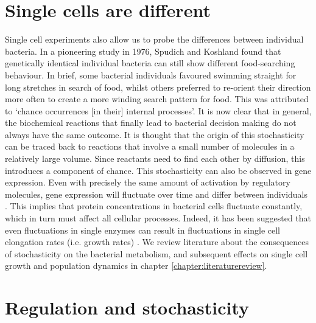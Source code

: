 \section{Single cells are different} 

Single cell experiments also allow us to probe the differences between individual bacteria.
%
In a pioneering study in 1976, 
%
Spudich and Koshland \cite{Spudich1976} found that genetically identical individual bacteria can still show different food-searching behaviour. 
In brief, some bacterial individuals favoured swimming straight for long stretches in search of food, 
whilst others preferred to re-orient their direction more often to create a more winding search pattern for food. 
%
This was attributed to \lq{chance occurrences [in their] internal processes}\rq.
%
It is now clear that in general,
the biochemical reactions that finally lead to bacterial decision making do not always have the same outcome.
%
It is thought that the origin of this stochasticity can be traced back to reactions that involve a small number of molecules in a relatively large volume.
Since reactants need to find each other by diffusion, this introduces a component of chance.
%
This stochasticity can also be observed in gene expression.
Even with precisely the same amount of activation by regulatory molecules, gene expression will fluctuate over time and differ between individuals \cite{Elowitz2002}.
%
This implies that protein concentrations in bacterial cells fluctuate constantly,
which in turn must affect all cellular processes.
%
Indeed, it has been suggested that even fluctuations in single enzymes can result in fluctuations in single cell elongation rates (i.e. growth rates) \cite{Kiviet2014}.
%
We review literature about the consequences of stochasticity on the bacterial metabolism, and subsequent effects on single cell growth and population dynamics in chapter \ref{chapter:literaturereview}.

\section{Regulation and stochasticity}

